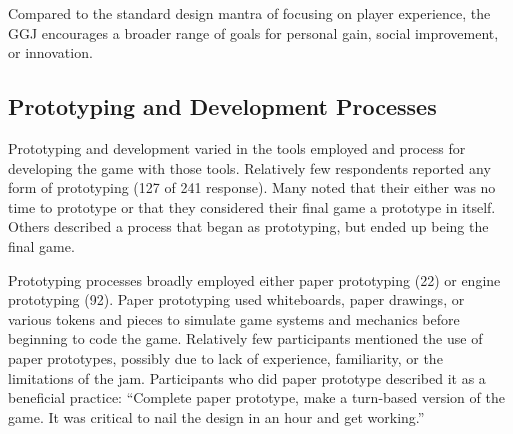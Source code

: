 \documentclass{sig-alternate}
\begin{document}
Compared to the standard design mantra of focusing on player experience, the GGJ encourages a broader range of goals for personal gain, social improvement, or innovation. 


\subsection{Prototyping and Development Processes}
Prototyping and development varied in the tools employed and process for developing the game with those tools. Relatively few respondents reported any form of prototyping (127 of 241 response). Many noted that their either was no time to prototype or that they considered their final game a prototype in itself. Others described a process that began as prototyping, but ended up being the final game.



Prototyping processes broadly employed either paper prototyping (22) or engine prototyping (92).
Paper prototyping used whiteboards, paper drawings, or various tokens and pieces to simulate game systems and mechanics before beginning to code the game. Relatively few participants mentioned the use of paper prototypes, possibly due to lack of experience, familiarity, or the limitations of the jam. Participants who did paper prototype described it as a beneficial practice:
``Complete paper prototype, make a turn-based version of the game. It was critical to nail the design in an hour and get working.''
\end{document}
